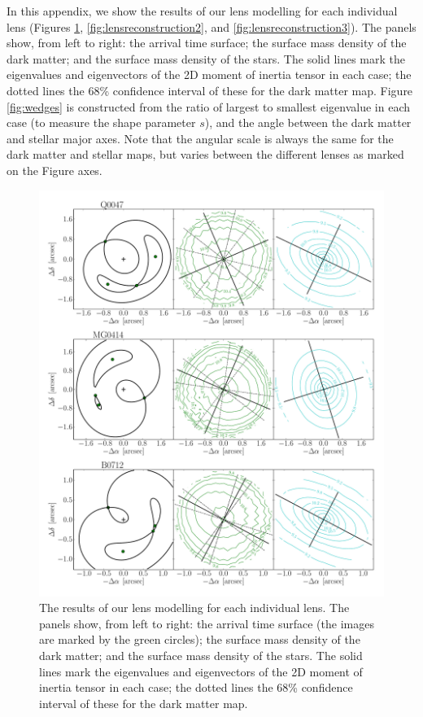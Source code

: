 \documentclass[useAMS,usenatbib]{mn2e}
\begin{document}
In this appendix, we show the results of our lens modelling for each individual lens (Figures \ref{fig:lensreconstruction1}, \ref{fig:lensreconstruction2}, and \ref{fig:lensreconstruction3}). The panels show, from left to right: the arrival time surface; the surface mass density of the dark matter; and the surface mass density of the stars. The solid lines mark the eigenvalues and eigenvectors of the 2D moment of inertia tensor in each case; the dotted lines the 68\% confidence interval of these for the dark matter map. Figure \ref{fig:wedges} is constructed from the ratio of largest to smallest eigenvalue in each case (to measure the shape parameter $s$), and the angle between the dark matter and stellar major axes. Note that the angular scale is always the same for the dark matter and stellar maps, but varies between the different lenses as marked on the Figure axes. 

\begin{figure}
  \centering
  \includegraphics[width=.8\linewidth]{Figures/AllLenses31.pdf}
  \caption[width=.65\linewidth]{The results of our lens modelling for each individual lens. The panels show, from left to right: the arrival time surface (the images are marked by the green circles); the surface mass density of the dark matter; and the surface mass density of the stars. The solid lines mark the eigenvalues and eigenvectors of the 2D moment of inertia tensor in each case; the dotted lines the 68\% confidence interval of these for the dark matter map.}
  \label{fig:lensreconstruction1}
\end{figure}
\end{document}
